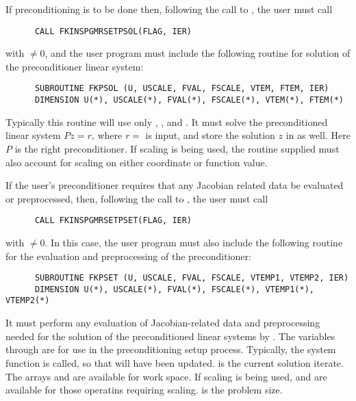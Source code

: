 \begin{Steps}
  If preconditioning is to be done then, following the
  call to , the user must call
\begin{verbatim}
      CALL FKINSPGMRSETPSOL(FLAG, IER)
\end{verbatim}
  with  $\neq 0$, and the user program must include the following routine
  for solution of the preconditioner linear system:
\begin{verbatim}
      SUBROUTINE FKPSOL (U, USCALE, FVAL, FSCALE, VTEM, FTEM, IER)
      DIMENSION U(*), USCALE(*), FVAL(*), FSCALE(*), VTEM(*), FTEM(*)
\end{verbatim}
  Typically this routine will use only , ,  and .
  It must solve the preconditioned linear system $Pz = r$, where
  $r = $  is input, and store the solution $z$ in  as well. 
  Here $P$ is the right preconditioner. If scaling is being used, the
  routine supplied must also account for scaling on either coordinate
  or function value.
  
  If the user's preconditioner requires that any Jacobian related data be evaluated
  or preprocessed, then, following the call to , the user must
  call 
\begin{verbatim}
      CALL FKINSPGMRSETPSET(FLAG, IER)
\end{verbatim}
  with  $\neq 0$. In this case, the user program must also include
  the following routine for the evaluation and preprocessing of the preconditioner:
\begin{verbatim}
      SUBROUTINE FKPSET (U, USCALE, FVAL, FSCALE, VTEMP1, VTEMP2, IER)
      DIMENSION U(*), USCALE(*), FVAL(*), FSCALE(*), VTEMP1(*), VTEMP2(*)
\end{verbatim}
  It must perform any evaluation of Jacobian-related data and
  preprocessing needed for the solution of the preconditioned linear
  systems by . The variables  through  are for use in the
  preconditioning setup process. Typically, the system function  is
  called, so that  will have been updated.  is the current solution
  iterate. The arrays  and  are available for work space. 
  If scaling is being used,  and  are available for those operatins
  requiring scaling.  is the problem size.
  

\end{Steps}
